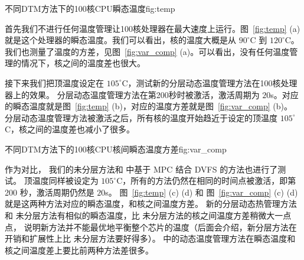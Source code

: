 \begin{pics}{不同DTM方法下的100核CPU瞬态温度}{fig:temp}
 \end{pics}
 
首先我们不进行任何温度管理让100核处理器在最大速度上运行。图~\ref{fig:temp} (a)就是这个处理器的瞬态温度。我们可以看出，核的温度大概是从 $90^{\circ}$C
到 $120^{\circ}$C。我们也测量了温度的方差，见图~\ref{fig:var_comp} (a)。可以看出，没有任何温度管理的情况下，核之间的温度差也很大。


接下来我们把顶温度设定在 $105^{\circ}$C，测试新的分层动态温度管理方法在100核处理器上的效果。
分层动态温度管理方法在第200秒时被激活，激活周期为 $20$s。对应的瞬态温度就是图~\ref{fig:temp} (b)，对应的温度方差就是图~\ref{fig:var_comp} (b)。
分层动态温度管理方法被激活之后，所有核的温度开始趋近于设定的顶温度 $105^{\circ}$C，核之间的温度差也减小了很多。

\begin{pics}[H]{不同DTM方法下的100核CPU核间瞬态温度方差}{fig:var_comp}
 \end{pics}
 
作为对比， 我们的未分层方法和 \cite{Zanini:ECCTD'09} 中基于 MPC 结合 DVFS 的方法也进行了测试。
顶温度同样被设定为 $105^{\circ}$C，所有的方法仍然在相同的时间点被激活，即第 200 秒，激活周期仍然是 $20$s。
图~\ref{fig:temp} (c) (d) 和 图~\ref{fig:var_comp} (c) (d) 就是这两种方法对应的瞬态温度，和核之间温度方差。
新的分层动态热管理方法和 未分层方法有相似的瞬态温度，比 未分层方法的核之间温度方差稍微大一点点，
说明新方法并不能最优地平衡整个芯片的温度（后面会介绍，新分层方法在开销和扩展性上比 未分层方法要好得多）。
\cite{Zanini:ECCTD'09} 中的动态温度管理方法在瞬态温度和核之间温度差上要比前两种方法差很多。



